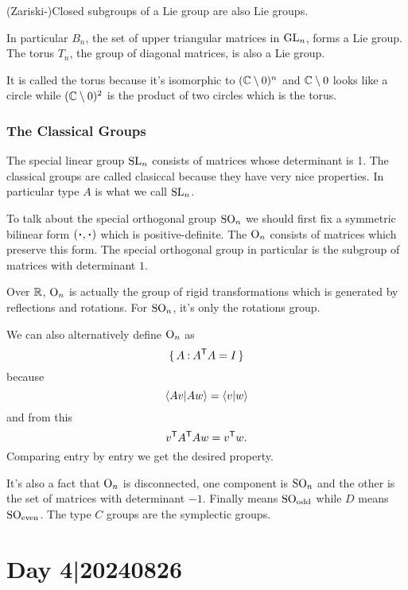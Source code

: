 \documentclass[12pt]{memoir}
\begin{document}
\begin{Lem}
(Zariski-)Closed subgroups of a Lie group are also Lie groups.
\end{Lem}

\begin{Ex}
    In particular $B_n$, the set of upper triangular matrices in $\mathrm{GL}_n$, forms a Lie group. The torus $T_n$, the group of diagonal matrices, is also a Lie group.\par 
    It is called the torus because it's isomorphic to $(\mathbb{C}\setminus0)^n$ and $\mathbb{C}\setminus 0$ looks like a circle while $(\mathbb{C}\setminus 0)^2$ is the product of two circles which is the torus.
\end{Ex}

\subsubsection{The Classical Groups}

The special linear group $\mathrm{SL}_n$ consists of matrices whose determinant is 1. The classical groups are called clasiccal because they have very nice properties. In particular type $A$ is what we call $\mathrm{SL}_n$.\par 
To talk about the special orthogonal group $\mathrm{SO}_n$ we should first fix a symmetric bilinear form $(\.,\.)$ which is positive-definite. The  $\mathrm{O}_n$ consists of matrices which preserve this form. The special orthogonal group in particular is the subgroup of matrices with determinant $1$.

\begin{Rmk}
Over $\mathbb{R}$, $\mathrm{O}_n$ is actually the group of rigid transformations which is generated by reflections and rotations. For $\mathrm{SO}_n$, it's only the rotations group.
\end{Rmk}

We can also alternatively define $\mathrm{O}_n$ as 
$$\{\,A\mathbin{:} A^{\mathsf{T}} A=I\,\}$$
because 
$$\bra{Av}\ket{Aw}=\bra{v}\ket{w}$$
and from this 
$$v^{\mathsf{T}} A^{\mathsf{T}} Aw=v^{\mathsf{T}} w.$$
Comparing entry by entry we get the desired property.\par 
It's also a fact that $\mathrm{O}_n$ is disconnected, one component is $\mathrm{SO}_n$ and the other is the set of matrices with determinant $-1$. Finally  means $\mathrm{SO}_{\text{odd}}$ while $D$ means $\mathrm{SO}_{\text{even}}$. The type $C$ groups are the symplectic groups.

\section{Day 4|20240826}
\end{document}
